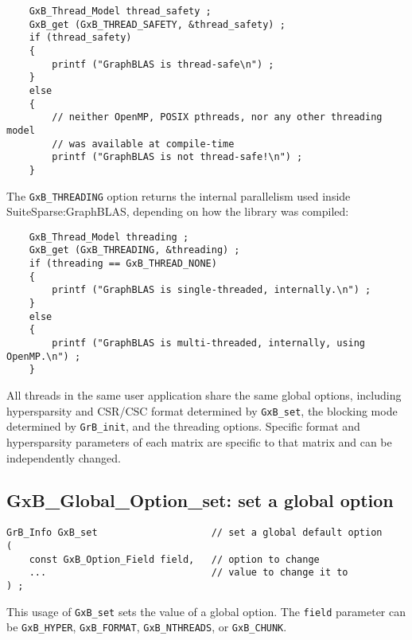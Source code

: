 \documentclass[12pt]{article}
\begin{document}
{\footnotesize
\begin{verbatim}
    GxB_Thread_Model thread_safety ;
    GxB_get (GxB_THREAD_SAFETY, &thread_safety) ;
    if (thread_safety)
    {
        printf ("GraphBLAS is thread-safe\n") ;
    }
    else
    {
        // neither OpenMP, POSIX pthreads, nor any other threading model
        // was available at compile-time
        printf ("GraphBLAS is not thread-safe!\n") ;
    }
\end{verbatim} }

The \verb'GxB_THREADING' option returns the internal parallelism used inside
SuiteSparse:GraphBLAS, depending on how the library was compiled:

{\footnotesize
\begin{verbatim}
    GxB_Thread_Model threading ;
    GxB_get (GxB_THREADING, &threading) ;
    if (threading == GxB_THREAD_NONE)
    {
        printf ("GraphBLAS is single-threaded, internally.\n") ;
    }
    else
    {
        printf ("GraphBLAS is multi-threaded, internally, using OpenMP.\n") ;
    }
\end{verbatim} }

All threads in the same user application share the same global options,
including hypersparsity and CSR/CSC format determined by \verb'GxB_set', the
blocking mode determined by \verb'GrB_init', and the threading options.
Specific format and hypersparsity parameters of each matrix are specific to
that matrix and can be independently changed.

\newpage
\subsection{{\sf GxB\_Global\_Option\_set:} set a global option}

\begin{mdframed}[userdefinedwidth=6in]
{\footnotesize
\begin{verbatim}
GrB_Info GxB_set                    // set a global default option
(
    const GxB_Option_Field field,   // option to change
    ...                             // value to change it to
) ;
\end{verbatim} } \end{mdframed}

This usage of \verb'GxB_set' sets the value of a global option.
The \verb'field' parameter can be \verb'GxB_HYPER', \verb'GxB_FORMAT',
\verb'GxB_NTHREADS', or \verb'GxB_CHUNK'.
\end{document}
